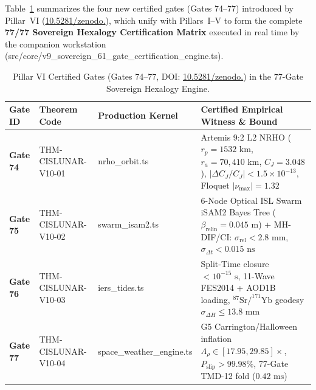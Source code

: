 \documentclass[11pt,a4paper,reqno]{article}
\def\texttt#1{#1}%
\newcommand{\zenodo}[1]{\href{https://doi.org/10.5281/zenodo.#1}{\texttt{10.5281/\allowbreak zenodo.\allowbreak #1}}}
\theoremstyle{plain}
\theoremstyle{definition}
\theoremstyle{remark}
\numberwithin{equation}{section}
\renewcommand{\arraystretch}{1.08}
\begin{document}
Table~\ref{tab:pillar_vi_gates} summarizes the four new certified gates (\texttt{Gates 74--77}) introduced by Pillar~VI (\zenodo{23227003}), which unify with Pillars~I--V to form the complete \textbf{77/77 Sovereign Hexalogy Certification Matrix} executed in real time by the companion workstation (\texttt{src/core/v9\_sovereign\_61\_gate\_certification\_engine.ts}).

\begin{table}[H]
\centering
\caption{Pillar VI Certified Gates (\texttt{Gates 74--77}, DOI: \zenodo{23227003}) in the 77-Gate Sovereign Hexalogy Engine.}
\label{tab:pillar_vi_gates}
\footnotesize
\setlength{\tabcolsep}{4pt}
\renewcommand{\arraystretch}{1.25}
\begin{tabularx}{\textwidth}{l l l X}
\toprule
\textbf{Gate ID} & \textbf{Theorem Code} & \textbf{Production Kernel} & \textbf{Certified Empirical Witness \& Bound} \\
\midrule
\textbf{Gate 74} & \texttt{THM-CISLUNAR-V10-01} & \texttt{nrho\_orbit.ts} & Artemis 9:2 L2 NRHO ($r_p = 1532\text{ km}$, $r_a = 70,410\text{ km}$, $C_J = 3.048$), $|\Delta C_J / C_J| < 1.5 \times 10^{-13}$, Floquet $|\nu_{\max}| = 1.32$ \\
\textbf{Gate 75} & \texttt{THM-CISLUNAR-V10-02} & \texttt{swarm\_isam2.ts} & 6-Node Optical ISL Swarm iSAM2 Bayes Tree ($\beta_{\text{relin}} = 0.045\text{ m}$) + MH-DIF/CI: $\sigma_{\text{rel}} < 2.8\text{ mm}$, $\sigma_{\Delta t} < 0.015\text{ ns}$ \\
\textbf{Gate 76} & \texttt{THM-CISLUNAR-V10-03} & \texttt{iers\_tides.ts} & Split-Time closure $< 10^{-15}\text{ s}$, 11-Wave FES2014 + AOD1B loading, $^{87}\text{Sr}/^{171}\text{Yb}$ geodesy $\sigma_{\Delta H} \le 13.8\text{ mm}$ \\
\textbf{Gate 77} & \texttt{THM-CISLUNAR-V10-04} & \texttt{space\_weather\_engine.ts} & G5 Carrington/Halloween inflation $\Lambda_\rho \in [17.95, 29.85]\times$, $P_{\text{slip}} > 99.98\%$, 77-Gate TMD-12 fold ($0.42\text{ ms}$) \\
\bottomrule
\end{tabularx}
\end{table}
\end{document}
